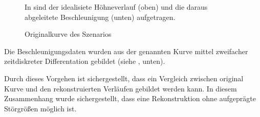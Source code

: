 \begin{figure}[ht!]
\vspace{0.25cm}
\begin{center}
\caption{Originalkurve des Szenarios}
\label{fig:SzeneOrigin}
\end{center}

\vspace{0.25cm}
In  sind der idealisiete Höhneverlauf (oben) und die daraus abgeleitete Beschleunigung (unten) aufgetragen.
\end{figure}


Die Beschleunigungsdaten wurden aus der genannten Kurve mittel zweifacher zeitdiskreter Differentation gebildet (siehe , unten).

Durch dieses Vorgehen ist sichergestellt, dass ein Vergleich zwischen original Kurve und den rekonstruierten Verläufen gebildet werden kann. In diesem Zusammenhang wurde sichergestellt, dass eine Rekonstruktion ohne aufgeprägte Störgrößen möglich ist.








